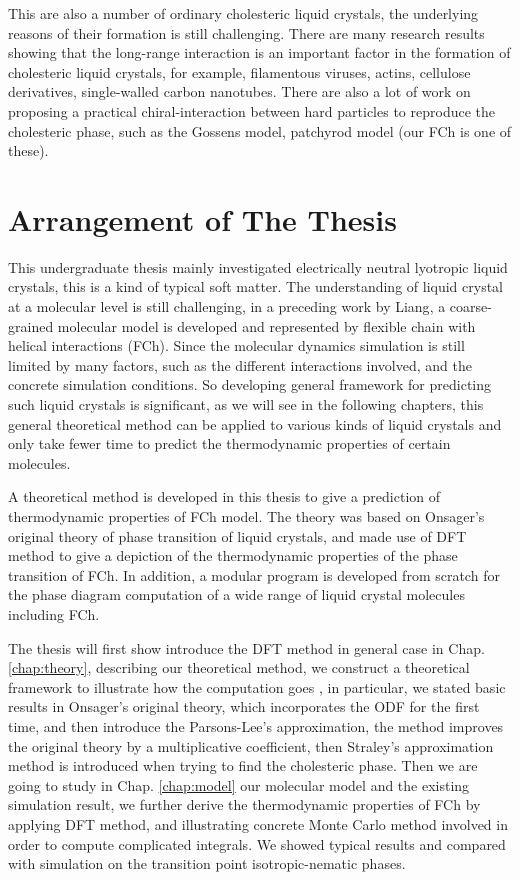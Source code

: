 This are also a number of ordinary cholesteric liquid crystals, the underlying reasons of their formation is still challenging. There are many research results showing that the long-range interaction is an important factor in the formation of cholesteric liquid crystals, for example, filamentous viruses\cite{35Dogic2006Ordered}, actins\cite{36Furukawa1993Formation}, cellulose derivatives\cite{37Werbowyj1980Ordered}, single-walled carbon nanotubes\cite{38Rai2007Dispersions}. There are also a lot of work on proposing a practical chiral-interaction between hard particles to reproduce the cholesteric phase, such as the Gossens model\cite{40Schoen2017Perturbation}, patchyrod model\cite{41Varga2006Study} (our FCh is one of these).

\section{Arrangement of The Thesis}

This undergraduate thesis mainly investigated electrically neutral lyotropic liquid crystals, this is a kind of typical soft matter. The understanding of liquid crystal at a molecular level is still challenging, in a preceding work by Liang\cite{Liang2017SM}, a coarse-grained molecular model is developed and represented by flexible chain with helical interactions (FCh). Since the molecular dynamics simulation is still limited by many factors, such as the different interactions involved, and the concrete simulation conditions. So developing general framework for predicting such liquid crystals is significant, as we will see in the following chapters, this general theoretical method can be applied to various kinds of liquid crystals and only take fewer time to predict the thermodynamic properties of certain molecules.

A theoretical method is developed in this thesis to give a prediction of thermodynamic properties of FCh model. The theory was based on Onsager's original theory of phase transition of liquid crystals, and made use of DFT method to give a depiction of the thermodynamic properties of the phase transition of FCh. In addition, a modular program is developed from scratch for the phase diagram computation of a wide range of liquid crystal molecules including FCh.

The thesis will first show introduce the DFT method in general case in Chap. \ref{chap:theory}, describing our theoretical method, we construct a theoretical framework to illustrate how the computation goes , in particular, we stated basic results in Onsager's original theory, which incorporates the ODF for the first time, and then introduce the Parsons-Lee's approximation, the method improves the original theory by a multiplicative coefficient, then Straley's approximation method is introduced when trying to find the cholesteric phase. Then we are going to study in Chap. \ref{chap:model} our molecular model and the existing simulation result, we further derive the thermodynamic properties of FCh by applying DFT method, and illustrating concrete Monte Carlo method involved in order to compute complicated integrals. We showed typical results and compared with simulation on the transition point isotropic-nematic phases.


